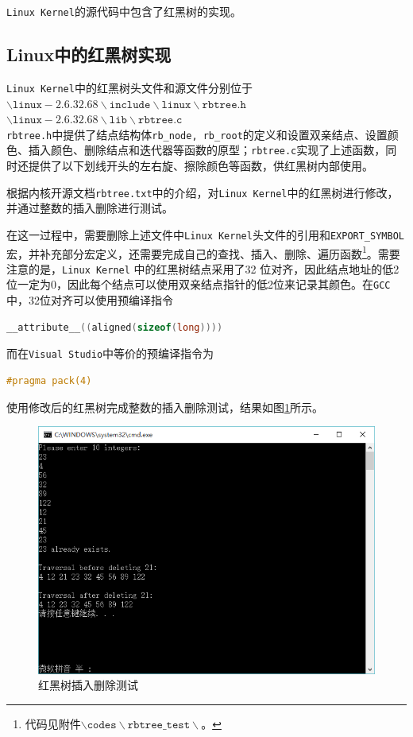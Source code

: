 \documentclass[a4paper, 11pt]{article}
\begin{document}
            \texttt{Linux Kernel}的源代码中包含了红黑树的实现。
            
        \subsection{Linux中的红黑树实现}
            \texttt{Linux Kernel}中的红黑树头文件和源文件分别位于 \\
            $\mathtt{\backslash linux-2.6.32.68\backslash include \backslash linux \backslash rbtree.h}$ \\
            $\mathtt{\backslash linux-2.6.32.68 \backslash lib \backslash rbtree.c}$ \\
            \texttt{rbtree.h}中提供了结点结构体\texttt{rb\_node, rb\_root}的定义和设置双亲结点、设置颜色、插入颜色、删除结点和迭代器等函数的原型；\texttt{rbtree.c}实现了上述函数，同时还提供了以下划线开头的左右旋、擦除颜色等函数，供红黑树内部使用。

            根据内核开源文档\texttt{rbtree.txt}\cite{rbtreetxt}中的介绍，对\texttt{Linux Kernel}中的红黑树进行修改，并通过整数的插入删除进行测试。

            在这一过程中，需要删除上述文件中\texttt{Linux Kernel}头文件的引用和\texttt{EXPORT\_SYMBOL}宏，并补充部分宏定义，还需要完成自己的查找、插入、删除、遍历函数\footnote{代码见附件$\mathtt{\backslash codes\backslash rbtree\_test\backslash}$。}。需要注意的是，\texttt{Linux Kernel} 中的红黑树结点采用了32 位对齐，因此结点地址的低2位一定为0，因此每个结点可以使用双亲结点指针的低2位来记录其颜色。在\texttt{GCC}中，32位对齐可以使用预编译指令
\begin{lstlisting}[language={C}]
__attribute__((aligned(sizeof(long))))
\end{lstlisting}
            而在\texttt{Visual Studio}中等价的预编译指令为
\begin{lstlisting}[language={C}]
#pragma pack(4)
\end{lstlisting}

            使用修改后的红黑树完成整数的插入删除测试，结果如图\ref{fig:rbtreetest}所示。
            \begin{figure}[htb]
                \centering
                \includegraphics[width=15cm]{images/rbtreetest.png}
                \caption{红黑树插入删除测试}
                \label{fig:rbtreetest}
            \end{figure}
\end{document}

